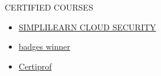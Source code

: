 \documentclass{resume}
\begin{document}
\begin{rSection}{CERTIFIED COURSES}
    \begin{itemize}
        \item \href{https://simpli-web.app.link/e/xZ3GpSgkkMb}{SIMPLILEARN CLOUD SECURITY}
        \item \href{https://www.credly.com/badges/6025a592-85b2-4f2b-ae92-93cf83aa0ef6}{badges winner}
        \item \href{https://app.kajabi.com/certificates/1d00b4fe}{Certiprof}
    \end{itemize}
    \vspace{-0.4em}
\end{rSection}
\end{document}
